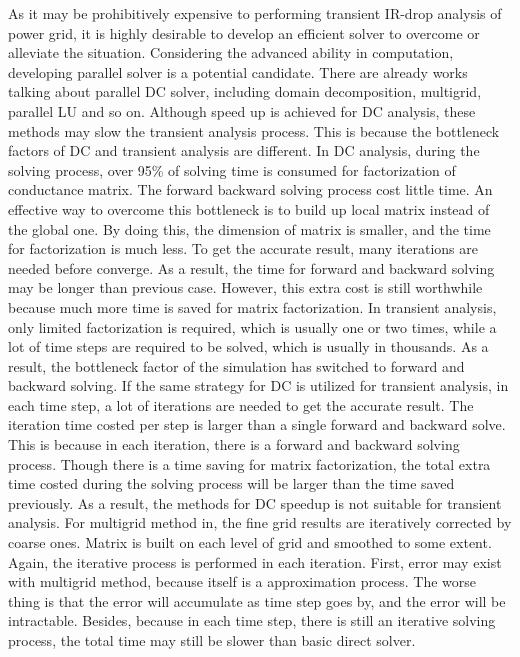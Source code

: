 As it may be prohibitively expensive to performing transient IR-drop analysis of power grid, it is highly desirable to develop an efficient solver to overcome or alleviate the situation. Considering the advanced ability in computation, developing parallel solver is a potential candidate. There are 
already
works talking about parallel DC solver, including domain decomposition\cite{PETSC_website, kaisun, voronov}, multigrid\cite{Zhuofeng,Kozhaya}, parallel LU\cite{Super_LU_website} %
and so on. Although speed up 
is achieved for DC analysis, these methods may slow the transient analysis process. This is because the bottleneck factors of DC and 
transient analysis are different. In DC analysis, during the solving process, over 95\% of solving time is consumed for factorization of 
conductance 
matrix. The forward backward solving process cost little time. An effective way to overcome this bottleneck is to build up local matrix
instead of the global one. By doing this, the dimension of matrix is smaller, and the time for factorization is much less. To get the 
accurate result, many iterations are needed before converge. As a result, the time for forward and backward solving may be longer than 
previous case. However, this extra cost is still worthwhile because much more time is saved for matrix factorization. In transient 
analysis, only limited factorization is required, which is usually one or two times, while a lot of time steps are required to be solved, 
which is usually in thousands. As a result, the bottleneck factor of the simulation has switched to forward and backward solving. If the same strategy for DC is utilized for transient analysis, in each time step, a lot of iterations are needed to get the accurate result. The 
iteration time costed per step is larger than a single forward and backward solve. This is because in each iteration, there is a forward 
and backward solving process. Though there is a time saving for matrix factorization, the total extra time costed during the solving 
process will be larger than the time saved previously. As a result, the methods for DC speedup is not suitable for transient analysis.
For multigrid method in\cite{Zhuofeng,Kozhaya}, the fine grid results are iteratively corrected by coarse ones. Matrix is built on each level of grid and 
smoothed to some extent. Again, the iterative process is performed in each iteration. First, error may exist with multigrid method, 
because itself is a approximation process. The worse thing is that the error will accumulate as time step goes by, and the error will be 
intractable. Besides, because in each time step, there is still an iterative solving process, the total time may still be slower than 
basic direct solver.

